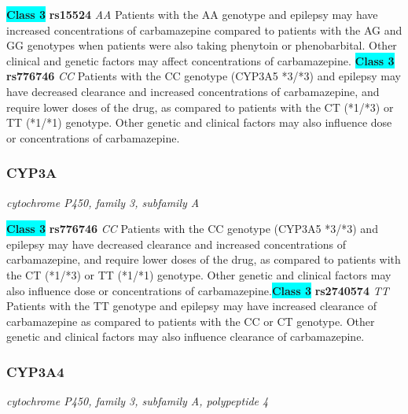 \documentclass{report}
\begin{document}
\textbf{\colorbox{cyan} {Class 3}} \textbf{ rs15524 } \textit{ AA }
Patients with the AA genotype and epilepsy may have increased concentrations of carbamazepine compared to patients with the AG and GG genotypes when patients were also taking phenytoin or phenobarbital. Other clinical and genetic factors may affect concentrations of carbamazepine. \newline\textbf{\colorbox{cyan} {Class 3}} \textbf{ rs776746 } \textit{ CC }
Patients with the CC genotype (CYP3A5 *3/*3) and epilepsy may have decreased clearance and increased concentrations of carbamazepine, and require lower doses of the drug, as compared to patients with the CT (*1/*3) or TT (*1/*1) genotype. Other genetic and clinical factors may also influence dose or concentrations of carbamazepine.\newline\subsubsection{ CYP3A }
\textit{ cytochrome P450, family 3, subfamily A }

\textbf{\colorbox{cyan} {Class 3}} \textbf{ rs776746 } \textit{ CC }
Patients with the CC genotype (CYP3A5 *3/*3) and epilepsy may have decreased clearance and increased concentrations of carbamazepine, and require lower doses of the drug, as compared to patients with the CT (*1/*3) or TT (*1/*1) genotype. Other genetic and clinical factors may also influence dose or concentrations of carbamazepine.\newline\textbf{\colorbox{cyan} {Class 3}} \textbf{ rs2740574 } \textit{ TT }
Patients with the TT genotype and epilepsy may have increased clearance of carbamazepine as compared to patients with the CC or CT genotype. Other genetic and clinical factors may also influence clearance of carbamazepine.\newline\subsubsection{ CYP3A4 }
\textit{ cytochrome P450, family 3, subfamily A, polypeptide 4 }
\end{document}

